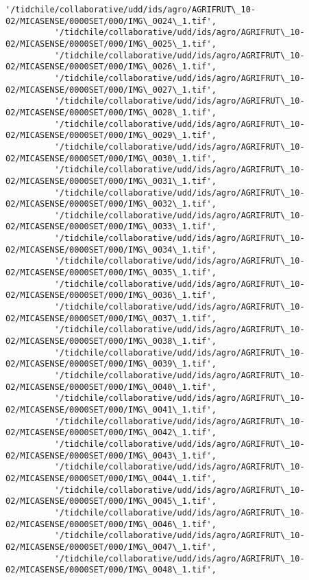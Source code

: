 \documentclass[11pt]{article}
\begin{document}
\begin{Verbatim}[commandchars=\\\{\}]
          '/tidchile/collaborative/udd/ids/agro/AGRIFRUT\_10-02/MICASENSE/0000SET/000/IMG\_0024\_1.tif',
          '/tidchile/collaborative/udd/ids/agro/AGRIFRUT\_10-02/MICASENSE/0000SET/000/IMG\_0025\_1.tif',
          '/tidchile/collaborative/udd/ids/agro/AGRIFRUT\_10-02/MICASENSE/0000SET/000/IMG\_0026\_1.tif',
          '/tidchile/collaborative/udd/ids/agro/AGRIFRUT\_10-02/MICASENSE/0000SET/000/IMG\_0027\_1.tif',
          '/tidchile/collaborative/udd/ids/agro/AGRIFRUT\_10-02/MICASENSE/0000SET/000/IMG\_0028\_1.tif',
          '/tidchile/collaborative/udd/ids/agro/AGRIFRUT\_10-02/MICASENSE/0000SET/000/IMG\_0029\_1.tif',
          '/tidchile/collaborative/udd/ids/agro/AGRIFRUT\_10-02/MICASENSE/0000SET/000/IMG\_0030\_1.tif',
          '/tidchile/collaborative/udd/ids/agro/AGRIFRUT\_10-02/MICASENSE/0000SET/000/IMG\_0031\_1.tif',
          '/tidchile/collaborative/udd/ids/agro/AGRIFRUT\_10-02/MICASENSE/0000SET/000/IMG\_0032\_1.tif',
          '/tidchile/collaborative/udd/ids/agro/AGRIFRUT\_10-02/MICASENSE/0000SET/000/IMG\_0033\_1.tif',
          '/tidchile/collaborative/udd/ids/agro/AGRIFRUT\_10-02/MICASENSE/0000SET/000/IMG\_0034\_1.tif',
          '/tidchile/collaborative/udd/ids/agro/AGRIFRUT\_10-02/MICASENSE/0000SET/000/IMG\_0035\_1.tif',
          '/tidchile/collaborative/udd/ids/agro/AGRIFRUT\_10-02/MICASENSE/0000SET/000/IMG\_0036\_1.tif',
          '/tidchile/collaborative/udd/ids/agro/AGRIFRUT\_10-02/MICASENSE/0000SET/000/IMG\_0037\_1.tif',
          '/tidchile/collaborative/udd/ids/agro/AGRIFRUT\_10-02/MICASENSE/0000SET/000/IMG\_0038\_1.tif',
          '/tidchile/collaborative/udd/ids/agro/AGRIFRUT\_10-02/MICASENSE/0000SET/000/IMG\_0039\_1.tif',
          '/tidchile/collaborative/udd/ids/agro/AGRIFRUT\_10-02/MICASENSE/0000SET/000/IMG\_0040\_1.tif',
          '/tidchile/collaborative/udd/ids/agro/AGRIFRUT\_10-02/MICASENSE/0000SET/000/IMG\_0041\_1.tif',
          '/tidchile/collaborative/udd/ids/agro/AGRIFRUT\_10-02/MICASENSE/0000SET/000/IMG\_0042\_1.tif',
          '/tidchile/collaborative/udd/ids/agro/AGRIFRUT\_10-02/MICASENSE/0000SET/000/IMG\_0043\_1.tif',
          '/tidchile/collaborative/udd/ids/agro/AGRIFRUT\_10-02/MICASENSE/0000SET/000/IMG\_0044\_1.tif',
          '/tidchile/collaborative/udd/ids/agro/AGRIFRUT\_10-02/MICASENSE/0000SET/000/IMG\_0045\_1.tif',
          '/tidchile/collaborative/udd/ids/agro/AGRIFRUT\_10-02/MICASENSE/0000SET/000/IMG\_0046\_1.tif',
          '/tidchile/collaborative/udd/ids/agro/AGRIFRUT\_10-02/MICASENSE/0000SET/000/IMG\_0047\_1.tif',
          '/tidchile/collaborative/udd/ids/agro/AGRIFRUT\_10-02/MICASENSE/0000SET/000/IMG\_0048\_1.tif',

\end{Verbatim}
\end{document}
